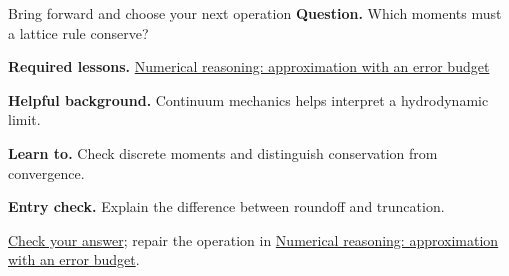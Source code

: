 \begin{learningcard}{Bring forward and choose your next operation}
\textsf{\textbf{Question.}} Which moments must a lattice rule conserve?\par
\textbf{Required lessons.} \hyperref[learn:numerical]{Numerical reasoning: approximation with an error budget}\par
\textbf{Helpful background.} Continuum mechanics helps interpret a hydrodynamic limit.\par
\textbf{Learn to.} Check discrete moments and distinguish conservation from convergence.\par
\textbf{Entry check.} Explain the difference between roundoff and truncation.\par
\hyperref[solution:entry:fluids]{Check your answer}; repair the operation in \hyperref[learn:numerical]{Numerical reasoning: approximation with an error budget}.
\end{learningcard}
